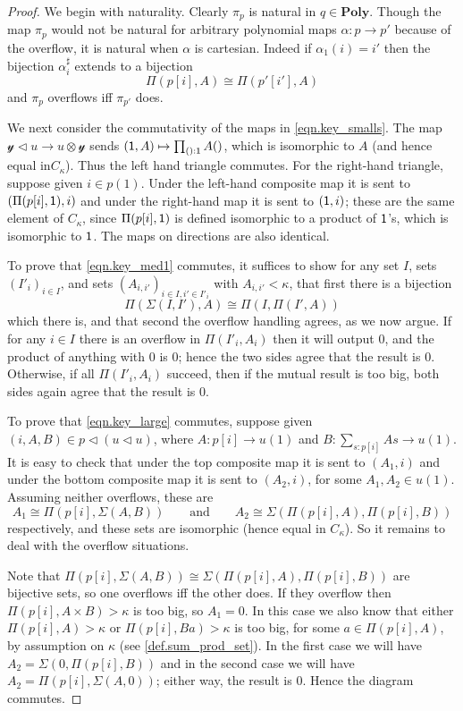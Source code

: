 \documentclass[11pt, one side, article]{memoir}
\theoremstyle{definition}
\theoremstyle{plain}
\newcommand{\Cat}[1]{\mathbf{#1}}%
\newcommand{\yon}{\mathcal{y}}
\newcommand{\poly}{\Cat{Poly}}
\newcommand{\0}{\textsf{0}}
\newcommand{\1}{\tn{\textsf{1}}}
\newcommand{\tri}{\mathbin{\triangleleft}}
\newcommand{\switch}{\pi}
\newcommand{\qqand}{\qquad\text{and}\qquad}
\begin{document}
\begin{proof}
We begin with naturality. Clearly $\switch_p$ is natural in $q\in\poly$. Though the map $\switch_{p}$ would not be natural for arbitrary polynomial maps $\alpha\colon p\to p'$ because of the overflow, it is natural when $\alpha$ is cartesian. Indeed if $\alpha_1(i)=i'$ then the bijection $\alpha_i^\sharp$ extends to a bijection
\[\Pi(p[i],A)\cong\Pi(p'[i'],A)\]
and $\switch_p$ overflows iff $\switch_{p'}$ does.

We next consider the commutativity of the maps in \eqref{eqn.key_smalls}. The map $\yon\tri u\to u\otimes\yon$ sends $(\1,A)\mapsto\prod_{():\1}A()$, which is isomorphic to $A$ (and hence equal in$C_\kappa$). Thus the left hand triangle commutes. For the right-hand triangle, suppose given $i\in p(1)$. Under the left-hand composite map it is sent to $(\Pi(p[i],\1),i)$ and under the right-hand map it is sent to $(\1,i)$; these are the same element of $C_\kappa$, since $\Pi(p[i],\1)$ is defined isomorphic to a product of $\1$'s, which is isomorphic to $\1$. The maps on directions are also identical.

To prove that \eqref{eqn.key_med1} commutes, it suffices to show for any set $I$, sets $(I'_i)_{i\in I}$, and sets $(A_{i,i'})_{i\in I, i'\in I'_i}$ with $A_{i,i'}<\kappa$, that first there is a bijection
\[\Pi(\Sigma(I,I'),A)\cong\Pi(I,\Pi(I',A))\]
which there is, and that second the overflow handling agrees, as we now argue. If for any $i\in I$ there is an overflow in $\Pi(I'_i,A_i)$ then it will output $0$, and the product of anything with $0$ is $0$; hence the two sides agree that the result is $0$. Otherwise, if all $\Pi(I'_i,A_i)$ succeed, then if the mutual result is too big, both sides again agree that the result is $0$. 

To prove that \eqref{eqn.key_large} commutes, suppose given $(i,A,B)\in p\tri(u\tri u)$, where $A\colon p[i]\to u(1)$ and $B\colon\sum_{s:p[i]}As\to u(1)$. It is easy to check that under the top composite map it is sent to  $(A_1,i)$ and under the bottom composite map it is sent to $(A_2,i)$, for some $A_1,A_2\in u(1)$. Assuming neither overflows, these are 
\[
  A_1\cong\Pi(p[i],\Sigma(A, B))
  \qqand
	A_2\cong\Sigma(\Pi(p[i],A),\Pi(p[i],B))
\] 
respectively, and these sets are isomorphic (hence equal in $C_\kappa$). So it remains to deal with the overflow situations.

Note that $\Pi(p[i],\Sigma(A, B))\cong\Sigma(\Pi(p[i],A),\Pi(p[i],B))$ are bijective sets, so one overflows iff the other does. If they overflow then $\Pi(p[i],A\times B)>\kappa$ is too big, so $A_1=0$. In this case we also know that either $\Pi(p[i],A)>\kappa$ or $\Pi(p[i],Ba)>\kappa$ is too big, for some $a\in\Pi(p[i],A)$, by assumption on $\kappa$ (see \cref{def.sum_prod_set}). In the first case we will have $A_2=\Sigma(0,\Pi(p[i],B))$ and in the second case we will have $A_2=\Pi(p[i],\Sigma(A, 0))$; either way, the result is $0$. Hence the diagram commutes.


\end{proof}
\end{document}
